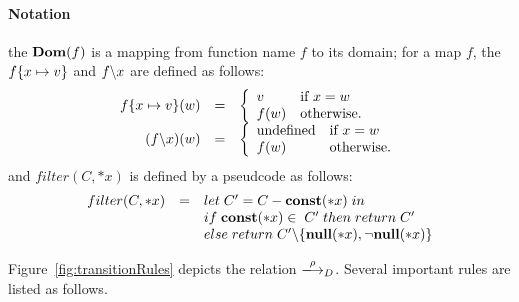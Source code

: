\paragraph{Notation} the \(\mathbf{Dom}(f)\) is a
mapping from function name \(f\) to its domain; for a map \(f\), the
\(f \{x \mapsto v\}\) and \( f \backslash x\) are defined as follows:
\[
\begin{array}{rcl}
f \{x \mapsto v\} (w) &=&
\left\{
\begin{array}{ll}
v & \mbox{if \(x = w\)}\\
f(w) & \mbox{otherwise.}
\end{array}
\right.\\
(f \backslash x)(w) &=&
\left\{
\begin{array}{ll}
\mbox{undefined} & \mbox{if \(x = w\)}\\
f(w) & \mbox{otherwise.}
\end{array}
\right.
\end{array}
\]
and \(filter(C, *x)\) is defined by a pseudcode as follows:
\[
\begin{array}{lcl}
  filter(C, *x) &=& let \; C' = C - \mathbf{const}(*x) \; in \\
  & & if \; \mathbf{const}(*x) \in \; C'\; then \; return \; C'\\
  & & else \; return \; C'\backslash\{{\bf null}(*x),\neg{\bf null}(*x) \}
\end{array}
\]

Figure~\ref{fig:transitionRules} depicts the relation
\(\xlongrightarrow{\rho}_D\). Several important rules are listed as
follows.

